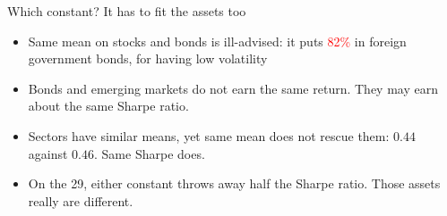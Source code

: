 \documentclass[aspectratio=169,10pt]{beamer}
\begin{document}
\begin{frame}{Which constant? It has to fit the assets too}
\vskip 2pt
\begin{center}
\renewcommand{\arraystretch}{1.25}
\end{center}
\vskip 8pt
\begin{itemize}
\item Same mean on stocks and bonds is ill-advised: it puts \textcolor{red}{82\%} in foreign government bonds, for having low volatility
\vskip 5pt
\item Bonds and emerging markets do not earn the same return. They may earn about the same Sharpe ratio.
\vskip 5pt
\item Sectors have similar means, yet same mean does not rescue them: $0.44$ against $0.46$. Same Sharpe does.
\vskip 5pt
\item On the 29, either constant throws away half the Sharpe ratio. Those assets really are different.
\end{itemize}
\end{frame}
\end{document}
